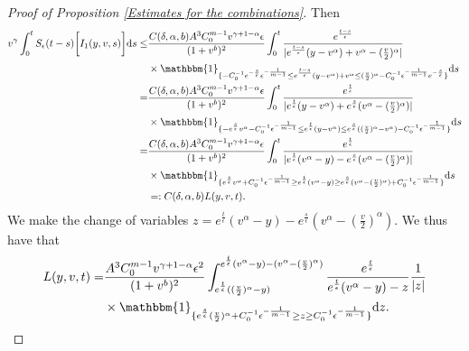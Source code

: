 \documentclass[11pt]{article}
\numberwithin{equation}{section}
\newcommand{\der}{\textup{d}}
\begin{document}
\begin{proof}[Proof of Proposition \ref{Estimates for the combinations}]
Then
\begin{align}
  v^{\gamma}\int_{0}^{t}S_{\epsilon}(t-s)\bigg[I_{1}(y,v,s)\bigg]\der s\leq &\frac{C(\delta, \alpha,b)A^{3}C_{0}^{m-1} v^{\gamma+1-\alpha}\epsilon }{(1+v^{b})^{2}}\int_{0}^{t}\frac{e^{\frac{t-s}{\epsilon}}}{|e^{\frac{t-s}{\epsilon}}(y-v^{\alpha})+v^{\alpha}-(\frac{v}{2})^{\alpha}|} \nonumber\\
      &\times\mathbbm{1}_{\{-C_{0}^{-1}e^{-\frac{s}{\epsilon}}\epsilon^{-\frac{1}{m-1}}\leq e^{\frac{t-s}{\epsilon}}(y-v^{\alpha})+v^{\alpha}\leq (\frac{v}{2})^{\alpha}-C_{0}^{-1}\epsilon^{-\frac{1}{m-1}}e^{-\frac{s}{\epsilon}}\}}\der s\nonumber\\
      =  &\frac{C(\delta, \alpha,b)A^{3}C_{0}^{m-1} v^{\gamma+1-\alpha}\epsilon }{(1+v^{b})^{2}}\int_{0}^{t}\frac{e^{\frac{t}{\epsilon}}}{|e^{\frac{t}{\epsilon}}(y-v^{\alpha})+e^{\frac{s}{\epsilon}}(v^{\alpha}-(\frac{v}{2})^{\alpha})|} \nonumber\\
      &\times \mathbbm{1}_{\{-e^{\frac{s}{\epsilon}}v^{\alpha}-C_{0}^{-1}\epsilon^{-\frac{1}{m-1}}\leq e^{\frac{t}{\epsilon}}(y-v^{\alpha})\leq e^{\frac{s}{\epsilon}}((\frac{v}{2})^{\alpha}-v^{\alpha})-C_{0}^{-1}\epsilon^{-\frac{1}{m-1}}\}}\der s\nonumber\\
         = & \frac{C(\delta, \alpha,b)A^{3}C_{0}^{m-1} v^{\gamma+1-\alpha}\epsilon }{(1+v^{b})^{2}}\int_{0}^{t}\frac{e^{\frac{t}{\epsilon}}}{|e^{\frac{t}{\epsilon}}(v^{\alpha}-y)-e^{\frac{s}{\epsilon}}(v^{\alpha}-(\frac{v}{2})^{\alpha})|} \nonumber\\
         &\times \mathbbm{1}_{\{e^{\frac{s}{\epsilon}}v^{\alpha}+C_{0}^{-1}\epsilon^{-\frac{1}{m-1}}\geq e^{\frac{t}{\epsilon}}(v^{\alpha}-y)\geq e^{\frac{s}{\epsilon}}(v^{\alpha}-(\frac{v}{2})^{\alpha})+C_{0}^{-1}\epsilon^{-\frac{1}{m-1}}\}}\der s\nonumber\\
         &=:C(\delta, \alpha,b)L(y,v,t).\label{region of integration}
\end{align}
We make the change of variables $z=e^{\frac{t}{\epsilon}}(v^{\alpha}-y)-e^{\frac{s}{\epsilon}}(v^{\alpha}-(\frac{v}{2})^{\alpha})$. We thus have that
\begin{align}\label{definition of L}
    L(y,v,t)        =  &\frac{A^{3}C_{0}^{m-1} v^{\gamma+1-\alpha}\epsilon^{2} }{(1+v^{b})^{2}}\int_{e^{\frac{t}{\epsilon}}((\frac{v}{2})^{\alpha}-y)}^{e^{\frac{t}{\epsilon}}(v^{\alpha}-y)-(v^{\alpha}-(\frac{v}{2})^{\alpha})}\frac{e^{\frac{t}{\epsilon}}}{e^{\frac{t}{\epsilon}}(v^{\alpha}-y)-z}\frac{1}{|z|}\nonumber\\
    &\times \mathbbm{1}_{\{e^{\frac{s}{\epsilon}}(\frac{v}{2})^{\alpha}+C_{0}^{-1}\epsilon^{-\frac{1}{m-1}}\geq z\geq C_{0}^{-1}\epsilon^{-\frac{1}{m-1}}\}}\der z.

\end{align}
\end{proof}
\end{document}
